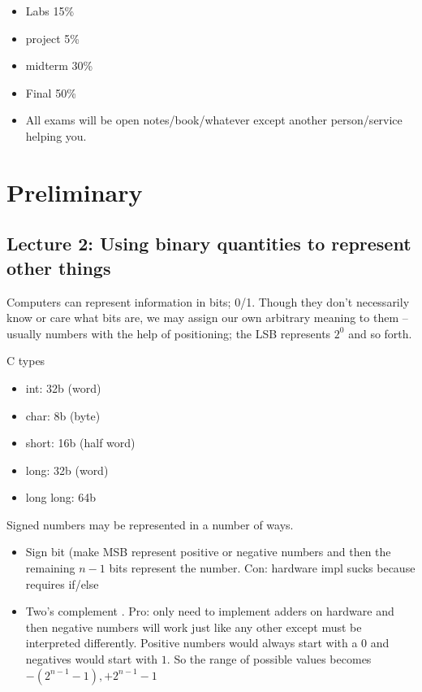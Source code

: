 \documentclass[../notes.tex]{subfiles}
\begin{document}
\begin{itemize}
	\item Labs 15\%
	\item project 5\%
	\item midterm  30\%
	\item Final 50\%
	\item All exams will be open notes/book/whatever except another person/service helping you.
\end{itemize}

\section{Preliminary}
\subsection{Lecture 2: Using binary quantities to represent other things}

Computers can represent information in bits; 0/1. 
Though they don't necessarily know or care what bits are, we may assign our own arbitrary meaning to them -- usually numbers with the help of positioning; the LSB represents $ 2^0 $ and so forth.

C types 
	\begin{itemize}
		\item int: 32b (word)
		\item char: 8b (byte)
		\item short: 16b (half word)
		\item long: 32b (word)
		\item long long: 64b
	\end{itemize}

Signed numbers may be represented in a number of ways.
\begin{itemize}
	\item Sign bit (make MSB represent positive or negative numbers and then the remaining $ n-1 $ bits represent the number. Con: hardware impl sucks because requires if/else
	\item Two's complement . Pro: only need to implement adders on hardware and then negative numbers will work just like any other except must be interpreted differently. Positive numbers would always start with a $ 0 $ and negatives would start with $ 1 $. So the range of possible values becomes $ -(2^{n-1}-1), +2^{n-1}-1$ 
\end{itemize}
\end{document}
